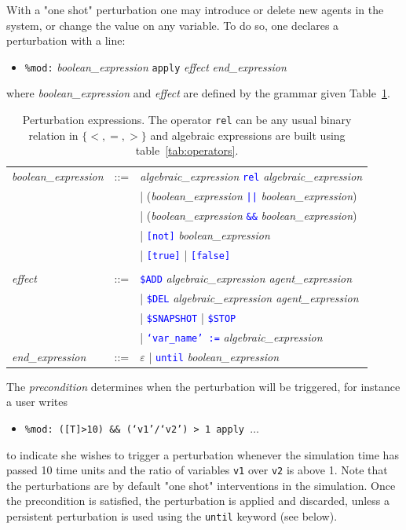 \documentclass[11pt]{book}
\def\tcb#1{\textcolor{blue}{\ttt{#1}}}
\def\ttt#1{\texttt{#1}}
\def\set#1{\{#1\}}
\def\ITE#1{\begin{itemize}#1\end{itemize}}
\begin{document}
 With a "one shot"  perturbation one may  introduce or delete new agents in the system, or change the value on any variable. To do so, one declares a perturbation with a line:
\ITE{
\item[] \ttt{\%mod:} \textit{boolean\_expression} \ttt{apply} \textit{effect} \textit{end\_expression}
}
where \textit{boolean\_expression} and \textit{effect} are defined by the grammar given  Table~\ref{tab:pert}.
\begin{table}[htbp]
  \centering
  \begin{tabular}{@{} lcl @{}}
    \textit{boolean\_expression} &::=& \textit{algebraic\_expression}\index{boolean expression} \tcb{rel} \textit{algebraic\_expression} \\
    && | (\textit{boolean\_expression} \tcb{||} \textit{boolean\_expression}) \\
    && | (\textit{boolean\_expression} \tcb{\&\&} \textit{boolean\_expression}) \\
    && | \tcb{[not]} \textit{boolean\_expression} \\
    && | \tcb{[true]} | \tcb{[false]} \\\\
    \textit{effect} &::=& \tcb{\$ADD} \textit{algebraic\_expression agent\_expression} \\
    && | \tcb{\$DEL} \textit{algebraic\_expression agent\_expression} \\
    && | \tcb{\$SNAPSHOT} | \tcb{\$STOP} \\ && | \tcb{`var\_name' :=} \textit{algebraic\_expression} \\
    \textit{end\_expression} &::=& $\varepsilon$ | \tcb{until} \textit{boolean\_expression}
    \end{tabular}
  \caption{Perturbation expressions. The operator \ttt{rel} can be any usual binary relation in $\set{<,=,>}$ and algebraic expressions are built using table~\ref{tab:operators}.}
  \label{tab:pert}
\end{table}
The \textit{precondition} determines when the perturbation will be triggered, for instance a user writes
\ITE{
\item[] \ttt{\%mod: ([T]>10) \&\& (`v1'/`v2') > 1 apply $\dots$}
}
to indicate she wishes to trigger a perturbation whenever the simulation time has passed 10 time units and the ratio of variables \ttt{v1} over \ttt{v2} is above 1. Note that the perturbations are by default "one shot" interventions in the simulation. Once the precondition is satisfied, the perturbation is applied and discarded, unless a persistent perturbation is used using the \ttt{until} keyword (see below). 
\end{document}

